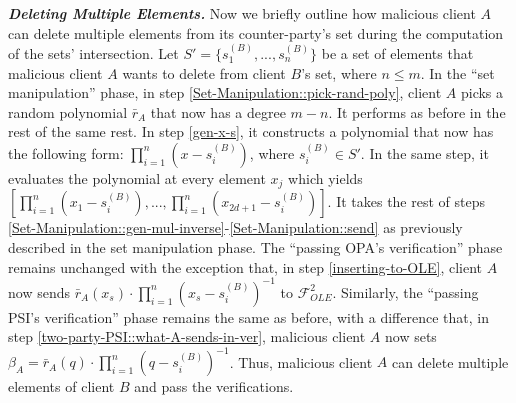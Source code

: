 \noindent\textit{\textbf{Deleting Multiple Elements.}} Now we briefly outline how  malicious client $A$ can delete multiple elements from its counter-party's set during the computation of the sets' intersection. Let $S'=\{s^{\scriptscriptstyle (B)}_{\scriptscriptstyle 1},...,s^{\scriptscriptstyle (B)}_{\scriptscriptstyle n}\}$ be a set of elements that malicious client $A$ wants to delete from client $B$'s set, where $n\leq m$. In the ``set manipulation'' phase, in step \ref{Set-Manipulation::pick-rand-poly},  client $A$  picks a random polynomial $\bar{r}_{\scriptscriptstyle A}$ that now has a degree $m-n$. It performs as before in the rest of the same rest. In step \ref{gen-x-s}, it constructs a polynomial that now has the following form: $\prod\limits^{\scriptscriptstyle n}_{\scriptscriptstyle i=1}(x-s^{\scriptscriptstyle (B)}_{\scriptscriptstyle i})$, where $ s^{\scriptscriptstyle (B)}_{\scriptscriptstyle i}\in S'$. In the same step, it evaluates the polynomial at every element $x_{\scriptscriptstyle j}$ which yields $[\prod\limits^{\scriptscriptstyle n}_{\scriptscriptstyle i=1}(x_{\scriptscriptstyle 1}-s^{\scriptscriptstyle (B)}_{\scriptscriptstyle i}),..., \prod\limits^{\scriptscriptstyle n}_{\scriptscriptstyle i=1}(x_{\scriptscriptstyle 2d+1}-s^{\scriptscriptstyle (B)}_{\scriptscriptstyle i})]$. It takes the rest of  steps \ref{Set-Manipulation::gen-mul-inverse}-\ref{Set-Manipulation::send} as previously described in the set manipulation phase. The ``passing OPA’s verification'' phase remains unchanged with the exception that, in step \ref{inserting-to-OLE}, client $A$ now sends $\bar{r}_{\scriptscriptstyle A}(x_{\scriptscriptstyle s})\cdot \prod\limits^{\scriptscriptstyle n}_{\scriptscriptstyle i=1}(x_{\scriptscriptstyle s}-s^{\scriptscriptstyle (B)}_{\scriptscriptstyle i})^{\scriptscriptstyle -1}$  to $\mathcal{F}_{\scriptscriptstyle OLE}^{\scriptscriptstyle 2}$. Similarly,  the ``passing PSI’s verification'' phase remains the same as before, with a difference that, in step \ref{two-party-PSI::what-A-sends-in-ver}, malicious client $A$ now sets     $\beta_{\scriptscriptstyle A}= \bar{r}_{\scriptscriptstyle A}(q)\cdot \prod\limits^{\scriptscriptstyle n}_{\scriptscriptstyle i=1}(q-s^{\scriptscriptstyle (B)}_{\scriptscriptstyle i})^{\scriptscriptstyle -1}$. Thus,  malicious client $A$ can delete multiple elements of client $B$ and pass the verifications.
   
   
   
